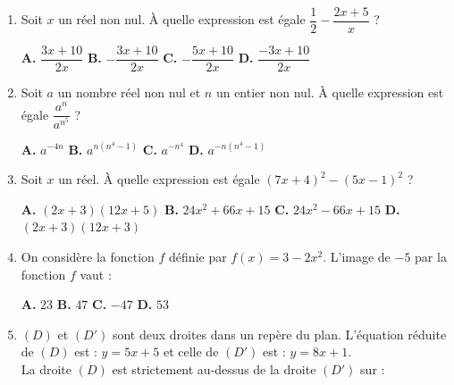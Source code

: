 \documentclass[a4paper,11pt]{article}
\begin{document}
\begin{seanceD}{} %

\begin{enumerate}
\item Soit $x$ un réel non nul. À quelle expression est égale $\dfrac{1}{2}-\dfrac{2x+5}{x}$ ?

\medskip
\begin{center}
\textbf{\textcolor{Couleur1}{A.}} $\dfrac{3x +10}{2x}$ \qquad \textbf{\textcolor{Couleur1}{B.}} $-\dfrac{3x +10}{2x}$ \qquad \textbf{\textcolor{Couleur1}{C.}} $-\dfrac{5x +10}{2x}$ \qquad \textbf{\textcolor{Couleur1}{D.}} $\dfrac{-3x +10}{2x}$
\end{center}


\item Soit $a$ un nombre réel non nul et $n$ un entier non nul. À quelle expression est égale $\dfrac{a^{n}}{a^{n^{5}}}$ ?

\medskip
\begin{center}
\textbf{\textcolor{Couleur1}{A.}} $a^{-4n}$ \qquad \textbf{\textcolor{Couleur1}{B.}} $a^{n(n^{4}-1)}$ \qquad \textbf{\textcolor{Couleur1}{C.}} $a^{-n^4}$ \qquad \textbf{\textcolor{Couleur1}{D.}} $a^{-n(n^{4}-1)}$
\end{center}


\item Soit $x$ un réel. À quelle expression est égale $\left(7x+4\right)^2-\left(5x-1\right)^2$ ?

\medskip
\begin{center}
\textbf{\textcolor{Couleur1}{A.}} $\left(2x+3\right)\left(12x+5\right)$ \qquad \textbf{\textcolor{Couleur1}{B.}} $24x^{2}+66x+15$ \qquad \textbf{\textcolor{Couleur1}{C.}} $24x^{2}-66x+15$ \qquad \textbf{\textcolor{Couleur1}{D.}} $\left(2x+3\right)\left(12x+3\right)$
\end{center}


\item On considère  la fonction $f$ définie par  $f(x)= 3-2x^2$. L'image de $-5$ par la fonction $f$ vaut :

\medskip
\begin{center}
\textbf{\textcolor{Couleur1}{A.}} $23$ \qquad \textbf{\textcolor{Couleur1}{B.}} $47$ \qquad \textbf{\textcolor{Couleur1}{C.}} $-47$ \qquad \textbf{\textcolor{Couleur1}{D.}} $53$
\end{center}


\item $(D)$ et $(D')$ sont deux droites dans un repère du plan.
    L'équation réduite de $(D)$ est : $y=5x+5$ et celle de $(D')$ est : $y=8x+1$.\\
    La droite $(D)$ est strictement au-dessus de la droite $(D')$ sur :


\end{enumerate}
\end{seanceD}
\end{document}

